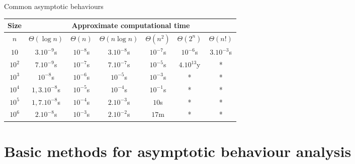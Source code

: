 \documentclass[english,10pt,table]{beamer}
\begin{document}
\begin{frame}{Common asymptotic behaviours}
	\begin{block}{}\footnotesize
	\begin{tabular}{|c|c|c|c|c|c|c|}
		\hline
		Size & \multicolumn{6}{c|}{Approximate computational time}\\ \hline
		$n$ & $\Theta(\log n)$ & $\Theta(n)$ & $\Theta(n \log n)$ & $\Theta(n^2)$ & $\Theta(2^n)$ & $\Theta(n!)$ \\ \hline
		$10$ & $3. 10^{-9}$s & $10^{-8}$s & $3. 10^{-8}$s & $10^{-7}$s & $10^{-6}$s & $3. 10^{-3}$s\\
		$10^2$ & $7. 10^{-9}$s & $10^{-7}$s & $7. 10^{-7}$s & $10^{-5}$s & $4. 10^{13}$y  & * \\
		$10^3$ & $10^{-8}$s & $10^{-6}$s & $10^{-5}$s & $10^{-3}$s  & * & * \\
		$10^4$ & $1,3. 10^{-8}$s & $10^{-5}$s & $10^{-4}$s & $10^{-1}$s & * & * \\
		$10^5$ & $1,7. 10^{-8}$s & $10^{-4}$s & $2. 10^{-3}$s & $10$s & * & * \\
		$10^6$ & $2. 10^{-8}$s & $10^{-3}$s & $2. 10^{-2}$s & $17$m & * & * \\ \hline
	\end{tabular}
  \end{block}
\end{frame}



\section{Basic methods for asymptotic behaviour analysis}
\end{document}
